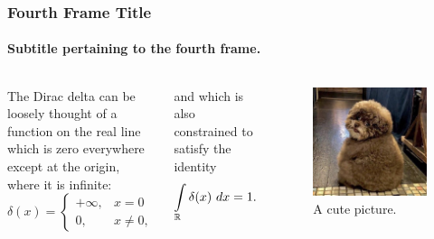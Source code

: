 \documentclass[aspectratio=169]{beamer}
\begin{document}
\begin{frame}
\frametitle{Fourth Frame Title}
\framesubtitle{Subtitle pertaining to the fourth frame.}

\begin{columns}


The Dirac delta can be loosely thought of a function on the real line which is zero everywhere except at the origin, where it is infinite:
\begin{equation}
    \delta (x) = \begin{cases} +\infty, &x = 0 \\ 0, &x \neq 0, \end{cases}
\end{equation}

and which is also constrained to satisfy the identity
\begin{equation}
    \int\limits_{\mathbb{R}} \delta (x)\ dx = 1.
\end{equation}


\begin{figure}[H]
\centering
{}
    \includegraphics[height=0.6\textheight]{../img/cute.jpg}
\caption{A cute picture.}
\end{figure}

\end{columns}

\end{frame}
\end{document}
